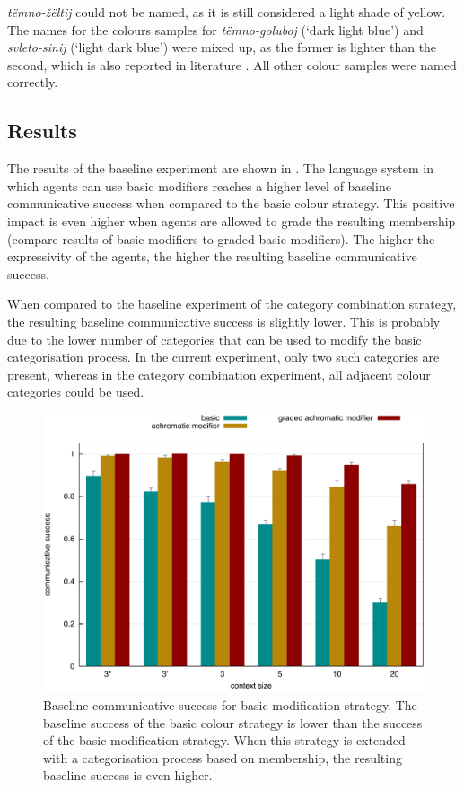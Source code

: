 \textit{t\"emno-\v z\"eltij} could not be
named, as it is still considered a light shade of yellow. The names
for the colours samples for \textit{t\"emno-goluboj} (`dark light blue')
and \textit{svleto-sinij} (`light dark blue') were mixed up, as the former
is lighter than the second, which is also reported in literature
\citep{safuanova07russian}. All other colour samples were named
correctly.

\subsection{Results}

The results of the baseline experiment are shown in . The language system in which agents can use
basic modifiers reaches a higher level of baseline communicative
success when compared to the basic colour strategy. This
positive impact is even higher when agents are allowed to grade the
resulting membership (compare results of basic modifiers to
graded basic modifiers). The higher the expressivity of the
agents, the higher the resulting baseline communicative success.

When compared to the baseline experiment of the category
  combination strategy, the resulting baseline communicative success
is slightly lower. This is probably due to the lower number of
categories that can be used to modify the basic categorisation
process. In the current experiment, only two such categories are
present, whereas in the category combination experiment, all
adjacent colour categories could be used.

\begin{figure}[htpb]
  \centering
  \includegraphics[width=.8\textwidth]{./achromatic/figures/baseline.pdf}
  \caption[Baseline communicative success for basic modification
  strategy]{Baseline communicative success for basic modification
    strategy. The baseline success of the basic colour strategy is
    lower than the success of the basic modification strategy. When
    this strategy is extended with a categorisation process based on
    membership, the resulting baseline success is even higher.}
  \label{f:ams-baseline}
\end{figure}

